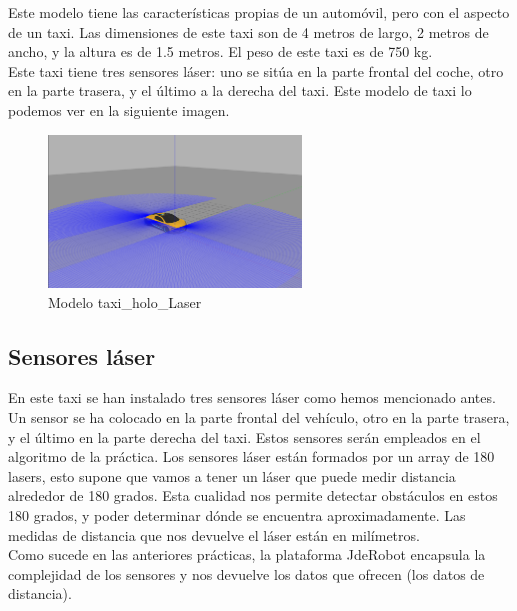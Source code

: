 Este modelo tiene las características propias de un automóvil, pero con el aspecto de un taxi. Las dimensiones de este taxi son de 4 metros de largo, 2 metros de ancho, y la altura es de 1.5 metros. El peso de este taxi es de 750 kg. \\

Este taxi tiene tres sensores láser: uno se sitúa en la parte frontal del coche, otro en la parte trasera, y el último a la derecha del taxi. Este modelo de taxi lo podemos ver en la siguiente imagen.\\

\begin{figure}[H]
  \begin{center}
    \includegraphics[width=0.6\textwidth]{figures/Autopark/taxiAutopark.png}
		\caption{Modelo taxi\_holo\_Laser}
		\label{fig.taxiAutopark}
		\end{center}
\end{figure}

\subsection{Sensores láser}
En este taxi se han instalado tres sensores láser como hemos mencionado antes. Un sensor se ha colocado en la parte frontal del vehículo, otro en la parte trasera, y el último en la parte derecha del taxi. Estos sensores serán empleados en el algoritmo de la práctica. Los sensores láser están formados por un array de 180 lasers, esto supone que vamos a tener un láser que puede medir distancia alrededor de 180 grados. Esta cualidad nos permite detectar obstáculos en estos 180 grados, y poder determinar dónde se encuentra aproximadamente. Las medidas de distancia que nos devuelve el láser están en milímetros. \\

Como sucede en las anteriores prácticas, la plataforma JdeRobot encapsula la complejidad de los sensores y nos devuelve los datos que ofrecen (los datos de distancia).\\

